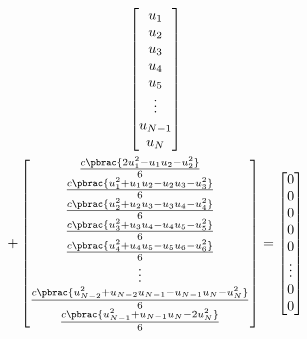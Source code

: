 \begin{multline}
\begin{bmatrix}
    u_{1} \\
    u_{2} \\
    u_{3} \\
    u_{4} \\
    u_{5} \\
    \vdots \\
    u_{N-1} \\
    u_{N}
  \end{bmatrix} \\
  + \begin{bmatrix}
    \frac{c\pbrac{2 u_{1}^{2}-u_{1}u_{2}-u_{2}^{2}}}{6} \\
    \frac{c\pbrac{u_{1}^{2}+u_{1}u_{2}-u_{2}u_{3}-u_{3}^{2}}}{6} \\
    \frac{c\pbrac{u_{2}^{2}+u_{2}u_{3}-u_{3}u_{4}-u_{4}^{2}}}{6} \\
    \frac{c\pbrac{u_{3}^{2}+u_{3}u_{4}-u_{4}u_{5}-u_{5}^{2}}}{6} \\
    \frac{c\pbrac{u_{4}^{2}+u_{4}u_{5}-u_{5}u_{6}-u_{6}^{2}}}{6} \\
    \vdots \\
    \frac{c\pbrac{u_{N-2}^{2}+u_{N-2}u_{N-1}-u_{N-1}u_{N}-u_{N}^{2}}}{6} \\
    \frac{c\pbrac{u_{N-1}^{2}+u_{N-1}u_{N}-2u_{N}^{2}}}{6}    
  \end{bmatrix} = \begin{bmatrix}
    0 \\
    0 \\
    0 \\
    0 \\
    0 \\
    \vdots \\
    0 \\
    0 \\
  \end{bmatrix}
\end{multline}
